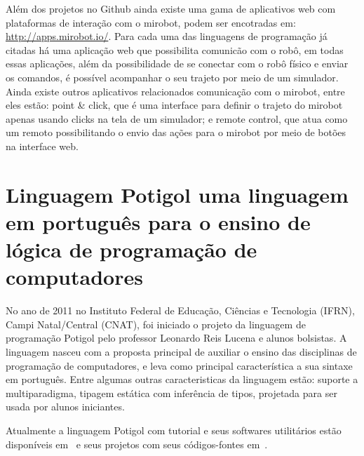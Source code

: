 Além dos projetos no Github ainda existe uma gama de aplicativos web com
plataformas de interação com o mirobot, podem ser encotradas em:
\url{http://apps.mirobot.io/}. Para cada uma das linguagens de programação já
citadas há uma aplicação web que possibilita comunicão com o robô, em todas
essas aplicações, além da possibilidade de se conectar com o robô físico e
enviar os comandos, é possível acompanhar o seu trajeto por meio de um
simulador.  Ainda existe outros aplicativos relacionados comunicação com o
mirobot, entre eles estão: point \& click, que é uma interface para definir o
trajeto do mirobot apenas usando clicks na tela de um simulador; e remote
control, que atua como um remoto possibilitando o envio das ações para o
mirobot por meio de botões na interface web.

\section{Linguagem Potigol uma linguagem em português para o ensino de lógica
de programação de computadores}
\label{sec:potigol}

No ano de 2011 no Instituto Federal de Educação, Ciências e Tecnologia (IFRN),
Campi Natal/Central (CNAT), foi iniciado o projeto da linguagem de programação
Potigol pelo professor Leonardo Reis Lucena e alunos bolsistas. A linguagem
nasceu com a proposta principal de auxiliar o ensino das disciplinas de
programação de computadores, e leva como principal característica a sua sintaxe
em português. Entre algumas outras caracteristicas da linguagem estão: suporte
a multiparadigma, tipagem estática com inferência de tipos, projetada para ser
usada por alunos iniciantes.

Atualmente a linguagem Potigol com tutorial e seus softwares utilitários estão disponíveis em~ e seus projetos com seus códigos-fontes em~.

